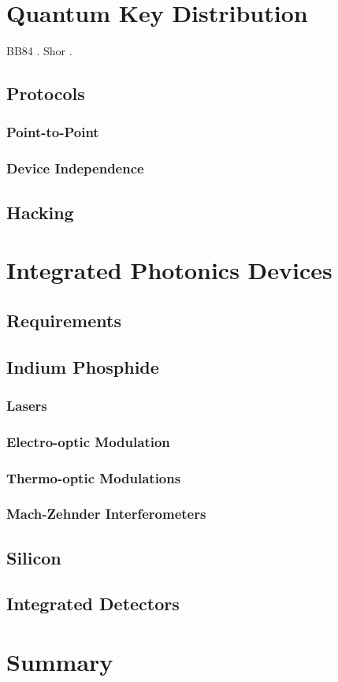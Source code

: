 \section{Quantum Key Distribution}

BB84 \cite{BB84}. Shor \cite{shor1994}.

\subsection{Protocols}

\subsubsection*{Point-to-Point}

\subsubsection*{Device Independence}

\subsection{Hacking}

\section{Integrated Photonics Devices}

\subsection{Requirements}

\subsection{Indium Phosphide}

\subsubsection{Lasers}

\subsubsection{Electro-optic Modulation}

\subsubsection{Thermo-optic Modulations}

\subsubsection{Mach-Zehnder Interferometers}

\subsection{Silicon}

\subsection{Integrated Detectors}

\section{Summary}


